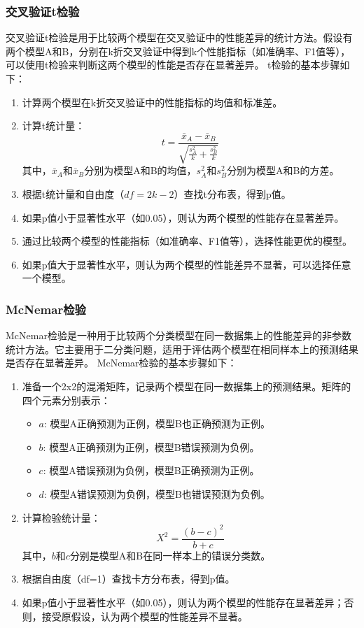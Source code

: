 \subsubsection{交叉验证t检验}
交叉验证t检验是用于比较两个模型在交叉验证中的性能差异的统计方法。假设有两个模型A和B，分别在k折交叉验证中得到k个性能指标（如准确率、F1值等），可以使用t检验来判断这两个模型的性能是否存在显著差异。
t检验的基本步骤如下：
\begin{enumerate}
    \item 计算两个模型在k折交叉验证中的性能指标的均值和标准差。
    \item 计算t统计量：
    \begin{equation}
        t = \frac{\bar{x}_A - \bar{x}_B}{\sqrt{\frac{s_A^2}{k} + \frac{s_B^2}{k}}}
    \end{equation}
    其中，$\bar{x}_A$和$\bar{x}_B$分别为模型A和B的均值，$s_A^2$和$s_B^2$分别为模型A和B的方差。
    \item 根据t统计量和自由度（$df = 2k - 2$）查找t分布表，得到p值。
    \item 如果p值小于显著性水平（如0.05），则认为两个模型的性能存在显著差异。
    \item 通过比较两个模型的性能指标（如准确率、F1值等），选择性能更优的模型。
    \item 如果p值大于显著性水平，则认为两个模型的性能差异不显著，可以选择任意一个模型。
\end{enumerate}
\subsubsection{McNemar检验}
McNemar检验是一种用于比较两个分类模型在同一数据集上的性能差异的非参数统计方法。它主要用于二分类问题，适用于评估两个模型在相同样本上的预测结果是否存在显著差异。
McNemar检验的基本步骤如下：
\begin{enumerate}
    \item 准备一个2x2的混淆矩阵，记录两个模型在同一数据集上的预测结果。矩阵的四个元素分别表示：
    \begin{itemize}
        \item $a$: 模型A正确预测为正例，模型B也正确预测为正例。
        \item $b$: 模型A正确预测为正例，模型B错误预测为负例。
        \item $c$: 模型A错误预测为负例，模型B正确预测为正例。
        \item $d$: 模型A错误预测为负例，模型B也错误预测为负例。
    \end{itemize}
    \item 计算检验统计量：
    \begin{equation}
        X^2 = \frac{(b - c)^2}{b + c}
    \end{equation}
    其中，$b$和$c$分别是模型A和B在同一样本上的错误分类数。
    \item 根据自由度（df=1）查找卡方分布表，得到p值。
    \item 如果p值小于显著性水平（如0.05），则认为两个模型的性能存在显著差异；否则，接受原假设，认为两个模型的性能差异不显著。
\end{enumerate}

